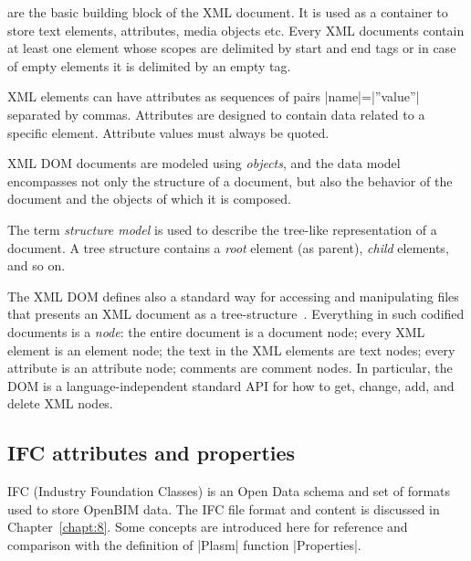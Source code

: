 \begin{coding}
\begin{definition} are the basic building block of the XML document. It is used as a container to store text elements, attributes, media objects etc. 
Every XML documents contain at least one element whose scopes are delimited by start and end tags or in case of empty elements it is delimited by an empty tag.
\end{definition}

\begin{definition} XML elements can have attributes as sequences of pairs |name|=|”value”| separated by commas. Attributes are designed to contain data related to a specific element. Attribute values must always be quoted.
\end{definition}


\begin{definition}
XML DOM documents are modeled using \emph{objects}, and the data model encompasses not only the structure of a document, but also the behavior of the document and the objects of which it is composed. 
\end{definition}

\begin{definition} The term \emph{structure model} is used to describe the tree-like representation of a document. A tree structure contains a \emph{root} element (as parent), \emph{child} elements, and so on.
\end{definition}

The XML DOM defines also a standard way for accessing and manipulating files that presents an XML document as a tree-structure~\cite{}. 
Everything in such codified documents is a \emph{node}:
the entire document is a document node; every XML element is an element node; the text in the XML elements are text nodes; every attribute is an attribute node; comments are comment nodes. In particular, the DOM is a  language-independent standard API for how to get, change, add, and delete XML nodes.



\subsection*{IFC attributes and properties}\label{sect:4-4-2}

IFC (Industry Foundation Classes) is an Open Data schema and set of formats used to store OpenBIM data.  
The IFC file format and content is discussed in Chapter~\ref{chapt:8}. Some concepts are introduced here for reference and comparison with the definition of |Plasm| function |Properties|.  


\end{coding}
